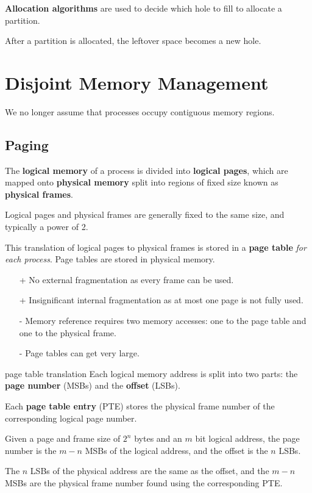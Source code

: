 \textbf{Allocation algorithms} are used to decide which hole to fill to allocate a partition.

\begin{itemize}
\end{itemize}

After a partition is allocated, the leftover space becomes a new hole.

\section{Disjoint Memory Management}
We no longer assume that processes occupy contiguous memory regions.


\subsection{Paging}
The \textbf{logical memory} of a process is divided into \textbf{logical pages}, which are mapped onto \textbf{physical memory} split into regions of fixed size known as \textbf{physical frames}.

Logical pages and physical frames are generally fixed to the same size, and typically a power of 2.

This translation of logical pages to physical frames is stored in a \textbf{page table} \textit{for each process}. Page tables are stored in physical memory.

\begin{itemize}
    \item[+] No external fragmentation as every frame can be used.
    \item[+] Insignificant internal fragmentation as at most one page is not fully used.
    \item[-] Memory reference requires two memory accesses: one to the page table and one to the physical frame.
    \item[-] Page tables can get very large.
\end{itemize}

\begin{defn}{page table translation}
    Each logical memory address is split into two parts: the \textbf{page number} (MSBs) and the \textbf{offset} (LSBs).

    Each \textbf{page table entry} (PTE) stores the physical frame number of the corresponding logical page number.

    Given a page and frame size of $2^n$ bytes and an $m$ bit logical address, the page number is the $m - n$ MSBs of the logical address, and the offset is the $n$ LSBs.

    The $n$ LSBs of the physical address are the same as the offset, and the $m - n$ MSBs are the physical frame number found using the corresponding PTE.
\end{defn}

